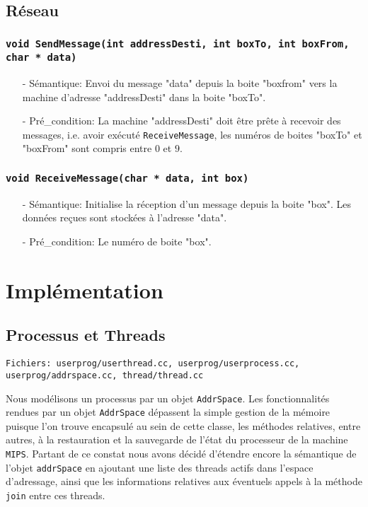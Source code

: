 \documentclass[11pt]{article}
\theoremstyle{definition}
\begin{document}
\subsection{Réseau}

\subsubsection{\texttt{void SendMessage(int addressDesti, int boxTo, int boxFrom, char * data)}}
\begin{itemize}
\item[-]Sémantique: Envoi du message "data" depuis la boite
 "boxfrom" vers la machine d'adresse "addressDesti" dans la boite "boxTo".
\item[-]Pré\_condition: La machine "addressDesti" doit être prête à recevoir des messages,
  i.e. avoir exécuté \texttt{ReceiveMessage}, les numéros de boites "boxTo" et "boxFrom" sont compris entre $0$ et $9$.
\end{itemize}

\subsubsection{\texttt{void ReceiveMessage(char * data, int box)}}
\begin{itemize}
\item[-]Sémantique: Initialise la réception d'un message depuis la boite "box".
  Les données reçues sont stockées à l'adresse "data".
\item[-]Pré\_condition: Le numéro de boite "box".
\end{itemize}


\section{Implémentation}

\subsection{Processus et Threads}

\begin{lstlisting}
Fichiers: userprog/userthread.cc, userprog/userprocess.cc, userprog/addrspace.cc, thread/thread.cc
\end{lstlisting}
Nous modélisons un processus par un objet \texttt{AddrSpace}.
Les fonctionnalités rendues par un objet \texttt{AddrSpace} dépassent la simple gestion de la mémoire puisque l'on trouve encapsulé au sein de cette classe, les méthodes relatives, entre autres, à la restauration et la sauvegarde de l'état du processeur de la machine \texttt{MIPS}.
Partant de ce constat nous avons décidé d'étendre encore la sémantique de l'objet \texttt{addrSpace} en ajoutant une liste des threads actifs dans l'espace d'adressage, ainsi que les informations relatives aux éventuels appels à la méthode \texttt{join} entre ces threads.
\end{document}
